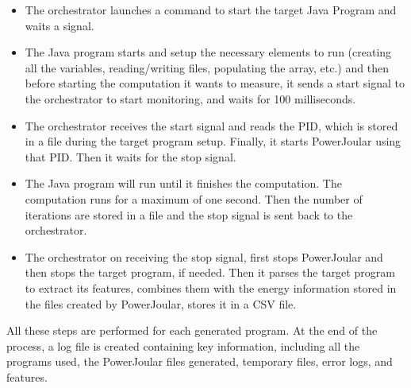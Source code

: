 \begin{itemize}
  \item The orchestrator launches a command to start the target Java Program and waits a signal.
  \item The Java program starts and setup the necessary elements to run (creating all the variables, reading/writing files, populating the array, etc.) and then before starting the computation it wants to measure, it sends a start signal to the orchestrator to start monitoring, and waits for 100 milliseconds.
  \item The orchestrator receives the start signal and reads the PID, which is stored in a file during the target program setup. Finally, it starts PowerJoular using that PID. Then it waits for the stop signal.
  \item The Java program will run until it finishes the computation. The computation runs for a maximum of one second. Then the number of iterations are stored in a file and the stop signal is sent back to the orchestrator.
  \item The orchestrator on receiving the stop signal, first stops PowerJoular and then stops the target program, if needed. Then it parses the target program to extract its features, combines them with the energy information stored in the files created by PowerJoular, stores it in a CSV file.
\end{itemize}

All these steps are performed for each generated program. At the end of the process, a log file is created containing key information, including all the programs used, the PowerJoular files generated, temporary files, error logs, and features.
